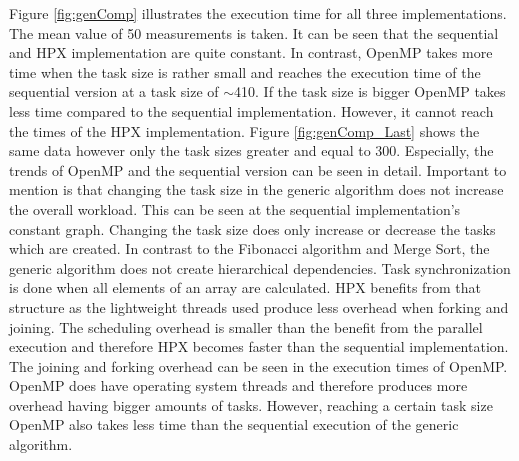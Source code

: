 Figure \ref{fig:genComp} illustrates the execution time for all three implementations.
The mean value of 50 measurements is taken.
It can be seen that the sequential and HPX implementation are quite constant.
In contrast, OpenMP takes more time when the task size is rather small and reaches the execution time of the sequential version at a task size of $\sim $410.
If the task size is bigger OpenMP takes less time compared to the sequential implementation.
However, it cannot reach the times of the HPX implementation.
Figure \ref{fig:genComp_Last} shows the same data however only the task sizes greater and equal to 300.
Especially, the trends of OpenMP and the sequential version can be seen in detail.
Important to mention is that changing the task size in the generic algorithm does not increase the overall workload.
This can be seen at the sequential implementation's constant graph.
Changing the task size does only increase or decrease the tasks which are created.
In contrast to the Fibonacci algorithm and Merge Sort, the generic algorithm does not create hierarchical dependencies.
Task synchronization is done when all elements of an array are calculated.
HPX benefits from that structure as the lightweight threads used produce less overhead when forking and joining.
The scheduling overhead is smaller than the benefit from the parallel execution and therefore HPX becomes faster than the sequential implementation.
The joining and forking overhead can be seen in the execution times of OpenMP.
OpenMP does have operating system threads and therefore produces more overhead having bigger amounts of tasks.
However, reaching a certain task size OpenMP also takes less time than the sequential execution of the generic algorithm.


